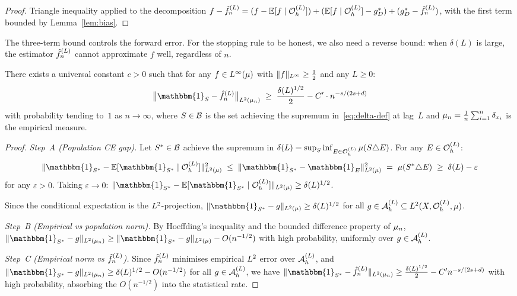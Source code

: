 \begin{proof}
Triangle inequality applied to the decomposition
$f - \hat{f}_n^{(L)} = (f - \mathbb{E}[f \mid \mathcal{O}_h^{(L)}]) + (\mathbb{E}[f \mid \mathcal{O}_h^{(L)}] - g_D^*)
+ (g_D^* - \hat{f}_n^{(L)})$, with the first term bounded by Lemma~\ref{lem:bias}.
\end{proof}

The three-term bound controls the forward error.
For the stopping rule to be honest, we also need a reverse bound: when
$\delta(L)$ is large, the estimator $\hat{f}_n^{(L)}$ cannot approximate $f$ well,
regardless of $n$.

\begin{lemma}
\label{lem:reverse}
There exists a universal constant $c > 0$ such that for any $f \in L^{\infty}(\mu)$
with $\|f\|_{L^{\infty}} \geq \frac{1}{2}$ and any $L \geq 0$:
\[
  \bigl\|\mathbbm{1}_S - \fhat\bigr\|_{\Lp{2}(\mun)}
  \;\geq\;
  \frac{\delta(L)^{1/2}}{2} - C' \cdot n^{-s/(2s+d)}
\]
with probability tending to~$1$ as $n \to \infty$, where $S \in \mathcal{B}$ is
the set achieving the supremum in~\eqref{eq:delta-def} at lag~$L$ and
$\mu_n = \frac{1}{n}\sum_{i=1}^n \delta_{x_i}$ is the empirical measure.
\end{lemma}

\begin{proof}
\emph{Step~A (Population CE gap).}
Let $S^* \in \mathcal{B}$ achieve the supremum in $\delta(L) = \sup_S \inf_{E \in \mathcal{O}_h^{(L)}} \mu(S \triangle E)$.
For any $E \in \mathcal{O}_h^{(L)}$:
\[
  \|\mathbbm{1}_{S^*} - \mathbb{E}[\mathbbm{1}_{S^*} \mid \OhL]\|_{\Lp{2}(\mu)}^2
  \;\leq\;
  \|\mathbbm{1}_{S^*} - \mathbbm{1}_E\|_{\Lp{2}(\mu)}^2
  \;=\; \mu(S^* \triangle E) \;\geq\; \delta(L) - \varepsilon
\]
for any $\varepsilon > 0$.
Taking $\varepsilon \to 0$: $\|\mathbbm{1}_{S^*} - \mathbb{E}[\mathbbm{1}_{S^*} \mid \OhL]\|_{\Lp{2}(\mu)}
\geq \delta(L)^{1/2}$.

Since the conditional expectation is the $L^{2}$-projection,
$\|\mathbbm{1}_{S^*} - g\|_{\Lp{2}(\mu)} \geq \delta(L)^{1/2}$ for all $g \in \mathcal{A}_h^{(L)} \subseteq L^{2}(X, \mathcal{O}_h^{(L)}, \mu)$.

\emph{Step~B (Empirical vs population norm).}
By Hoeffding's inequality and the bounded difference property of $\mu_n$,
$\|\mathbbm{1}_{S^*} - g\|_{\Lp{2}(\mun)} \geq \|\mathbbm{1}_{S^*} - g\|_{\Lp{2}(\mu)} - O(n^{-1/2})$
with high probability, uniformly over $g \in \mathcal{A}_h^{(L)}$.

\emph{Step~C (Empirical norm vs $\hat{f}_n^{(L)}$).}
Since $\hat{f}_n^{(L)}$ minimises empirical $L^{2}$ error over $\mathcal{A}_h^{(L)}$, and
$\|\mathbbm{1}_{S^*} - g\|_{\Lp{2}(\mun)} \geq \delta(L)^{1/2} - O(n^{-1/2})$
for all $g \in \mathcal{A}_h^{(L)}$, we have
$\|\mathbbm{1}_{S^*} - \fhat\|_{\Lp{2}(\mun)} \geq \frac{\delta(L)^{1/2}}{2} - C' n^{-s/(2s+d)}$
with high probability, absorbing the $O(n^{-1/2})$ into the statistical rate.
\end{proof}

